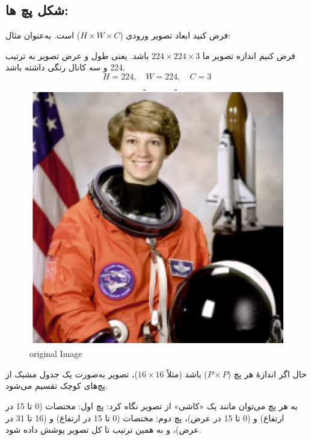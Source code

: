 \subsection{شکل پچ ها:}

فرض کنید ابعاد تصویر ورودی ($H \times W \times C$) است. به‌عنوان مثال:


فرض کنیم اندازه تصویر ما $224 \times 224 \times 3$ باشد. یعنی طول و عرض تصویر به ترتیب 224 و سه کانال رنگی داشته باشد.
\[
H = 224, \quad W = 224, \quad C = 3
\]




\begin{figure}[h]
	\centering
	\begin{minipage}[b]{0.9\textwidth}
		\centering
		\includegraphics[width=\textwidth]{transformer_images/space_original_image.png}
		\caption{original Image}
		\label{fig:Original Image}
	\end{minipage}
	\hfill
	
\end{figure}


حال اگر اندازهٔ هر پچ ($P \times P$) باشد (مثلاً $16 \times 16$)، تصویر به‌صورت یک جدول مشبک از پچ‌های کوچک تقسیم می‌شود.

به هر پچ می‌توان مانند یک «کاشی» از تصویر نگاه کرد:
پچ اول: مختصات (0 تا 15 در ارتفاع) و (0 تا 15 در عرض)،
پچ دوم: مختصات (0 تا 15 در ارتفاع) و (16 تا 31 در عرض)،
و به همین ترتیب تا کل تصویر پوشش داده شود.



